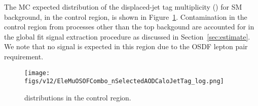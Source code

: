 The MC expected distribution of the displaced-jet tag multiplicity (\NTAGS)
for SM background, in the \elemuall control region,
is shown in Figure~\ref{fig:elemuntag_2}.
Contamination in the control region from processes other than the top backgound are
accounted for  in the global fit signal extraction procedure as discussed in
Section~\ref{sec:estimate}. We note that no signal is expected in this region
due to the OSDF lepton pair requirement.


\begin{figure}[h!]
  \caption{\NTAGS distributions in the \elemuall control region.}
  \label{fig:elemuntag_2}
  \centering
  \texttt{[image: figs/v12/EleMuOSOFCombo\_nSelectedAODCaloJetTag\_log.png]}
\end{figure}

%

